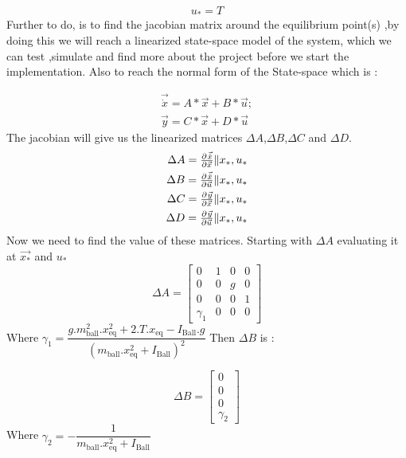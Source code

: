 \documentclass{article}
\begin{document}
\begin{equation}
	\begin{split}
		u_* = T
	\end{split}
\end{equation}
Further to do, is to find the jacobian matrix around the equilibrium point(s) ,by doing this we will reach a linearized state-space model of the system,
which we can test ,simulate and find more about the project before we start the implementation.
Also to reach the normal form of the State-space which is :

\begin{equation}
	\begin{split}
		\vec{\dot{x}} = A*\vec{x} + B*\vec{u};\\
		\vec{y}  = C*\vec{x} + D*\vec{u}
	\end{split}
\end{equation}
The jacobian will give us the linearized matrices $\Delta A$,$\Delta B$,$\Delta C$ and $\Delta D$.
\begin{equation}
	\begin{split}
		\Delta A = \pd{\vec{\dot{x}}}{\vec{x}}\|x_*,u_*\\
		\Delta B = \pd{\vec{\dot{x}}}{\vec{u}}\|x_*,u_*\\
		\Delta C = \pd{\vec{y}}{\vec{x}}\|x_*,u_* \\
		\Delta D = \pd{\vec{y}}{\vec{u}}\|x_*,u_*
	\end{split}
\end{equation}
Now we need to find the value of these matrices.
Starting with $\Delta A$ evaluating it at $\vec{x_*}$ and $u_*$
\begin{equation}
	\Delta A =
	\begin{bmatrix}
		0 &1 &0 &0\\
		0 &0 & g &0\\
		0 &0 &0 &1 \\
		\gamma_1 & 0 & 0 & 0
	\end{bmatrix}
\end{equation}
Where $\gamma_1 = \dfrac{g.m_{\text{ball}}^2.x_{\text{eq}}^2 + 2.T.x_{\text{eq}}- I_{\text{Ball}}.g}{(m_{\text{ball}}.x_{\text{eq}}^2 + I_{\text{Ball}})^2}$
\newpage
Then $\Delta B$ is :

\begin{equation}
	\Delta B =
	\begin{bmatrix}
		0 \\
		0 \\
		0 \\
		\gamma_2
	\end{bmatrix}
\end{equation}
Where $ \gamma_2 = - \dfrac{1}{m_{\text{ball}}.x_{\text{eq}}^2 + I_{\text{Ball}}}$
\end{document}
